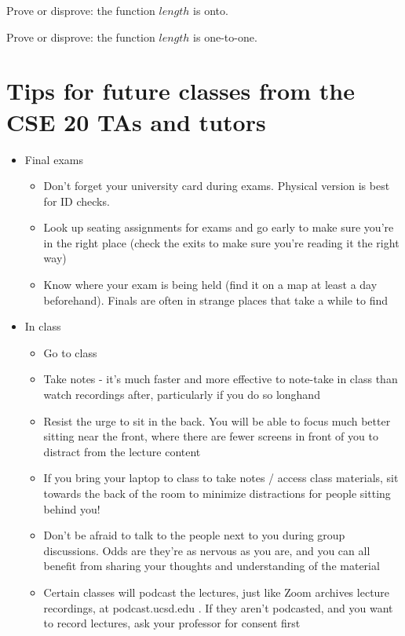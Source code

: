 \documentclass[12pt, oneside]{article}
\begin{document}
Prove or disprove: the function $length$ is onto.

\vfill

Prove or disprove: the function $length$ is one-to-one.

\vfill
 \newpage


\section*{Tips for future classes from the CSE 20 TAs and tutors}
\begin{itemize}
\item Final exams
\begin{itemize}
\item Don't forget your university card during exams. Physical version is best for ID checks.
\item Look up seating assignments for exams and go early to make sure you're in the right place (check the exits to make sure you're reading it the right way) 
\item Know where your exam is being held (find it on a map at least a day beforehand). Finals are often in strange places that take a while to find 
\end{itemize} \item In class
\begin{itemize}
\item Go to class
\item Take notes - it's much faster and more effective to note-take in class than watch recordings after, particularly if you do so longhand
\item Resist the urge to sit in the back. You will be able to focus much better sitting near the front, where there are fewer screens in front of you to distract from the lecture content
\item If you bring your laptop to class to take notes / access class materials, sit towards the back of the room to minimize distractions for people sitting behind you!
\item Don't be afraid to talk to the people next to you during group discussions. Odds are they're as nervous as you are, and you can all benefit from sharing your thoughts and understanding of the material 
\item Certain classes will podcast the lectures, just like Zoom archives lecture recordings, at podcast.ucsd.edu . If they aren't podcasted, and you want to record lectures, ask your professor for consent first
\end{itemize}

\end{itemize}
\end{document}
